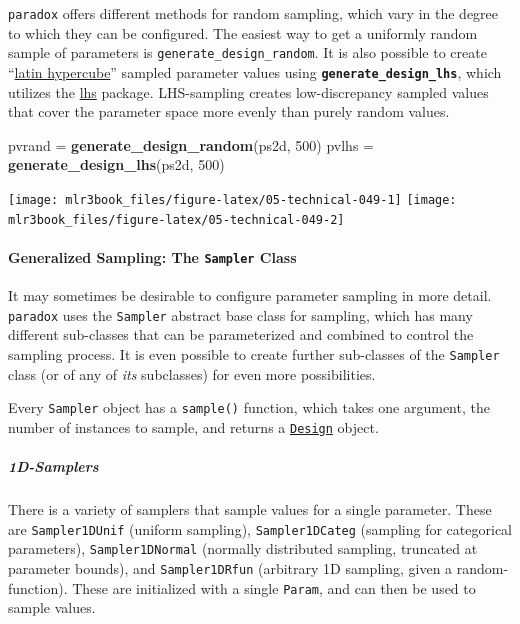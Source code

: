 \documentclass[]{article}
\newenvironment{Shaded}{\begin{snugshade}}{\end{snugshade}}
\newcommand{\DecValTok}[1]{\textcolor[rgb]{0.00,0.00,0.81}{#1}}
\newcommand{\KeywordTok}[1]{\textcolor[rgb]{0.13,0.29,0.53}{\textbf{#1}}}
\newcommand{\NormalTok}[1]{#1}
\newcommand{\StringTok}[1]{\textcolor[rgb]{0.31,0.60,0.02}{#1}}
\let\oldparagraph\paragraph
\renewcommand{\paragraph}[1]{\oldparagraph{#1}\mbox{}}
\let\oldsubparagraph\subparagraph
\renewcommand{\subparagraph}[1]{\oldsubparagraph{#1}\mbox{}}
\renewenvironment{Shaded} {\begin{snugshade}\small} {\end{snugshade}}
\begin{document}
\texttt{paradox} offers different methods for random sampling, which vary in the degree to which they can be configured.
The easiest way to get a uniformly random sample of parameters is \texttt{generate\_design\_random}.
It is also possible to create ``\href{https://en.wikipedia.org/wiki/Latin_hypercube_sampling}{latin hypercube}'' sampled parameter values using \textbf{\texttt{generate\_design\_lhs}}, which utilizes the \href{https://cran.r-project.org/package=lhs}{lhs} package.
LHS-sampling creates low-discrepancy sampled values that cover the parameter space more evenly than purely random values.

\begin{Shaded}
\begin{Highlighting}[]
\NormalTok{pvrand =}\StringTok{ }\KeywordTok{generate_design_random}\NormalTok{(ps2d, }\DecValTok{500}\NormalTok{)}
\NormalTok{pvlhs =}\StringTok{ }\KeywordTok{generate_design_lhs}\NormalTok{(ps2d, }\DecValTok{500}\NormalTok{)}
\end{Highlighting}
\end{Shaded}

\texttt{[image: mlr3book\_files/figure-latex/05-technical-049-1]} \texttt{[image: mlr3book\_files/figure-latex/05-technical-049-2]}

\hypertarget{generalized-sampling-the-sampler-class}{%
\paragraph{\texorpdfstring{Generalized Sampling: The \texttt{Sampler} Class}{Generalized Sampling: The Sampler Class}}\label{generalized-sampling-the-sampler-class}}

It may sometimes be desirable to configure parameter sampling in more detail.
\texttt{paradox} uses the \texttt{Sampler} abstract base class for sampling, which has many different sub-classes that can be parameterized and combined to control the sampling process.
It is even possible to create further sub-classes of the \texttt{Sampler} class (or of any of \emph{its} subclasses) for even more possibilities.

Every \texttt{Sampler} object has a \texttt{sample()} function, which takes one argument, the number of instances to sample, and returns a \protect\hyperlink{parameter-designs}{\texttt{Design}} object.

\hypertarget{d-samplers}{%
\subparagraph{1D-Samplers}\label{d-samplers}}

There is a variety of samplers that sample values for a single parameter.
These are \texttt{Sampler1DUnif} (uniform sampling), \texttt{Sampler1DCateg} (sampling for categorical parameters), \texttt{Sampler1DNormal} (normally distributed sampling, truncated at parameter bounds), and \texttt{Sampler1DRfun} (arbitrary 1D sampling, given a random-function).
These are initialized with a single \texttt{Param}, and can then be used to sample values.
\end{document}
